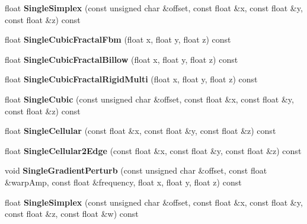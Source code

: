 \begin{DoxyCompactItemize}
\item 
\mbox{\label{class_flounder_1_1_noise_fast_a044f435d09484d9ad846e80c11ecf62e}} 
float {\bfseries Single\+Simplex} (const unsigned char \&offset, const float \&x, const float \&y, const float \&z) const
\item 
\mbox{\label{class_flounder_1_1_noise_fast_a8530cc6bcd53911eb6e41cdb64f566ca}} 
float {\bfseries Single\+Cubic\+Fractal\+Fbm} (float x, float y, float z) const
\item 
\mbox{\label{class_flounder_1_1_noise_fast_a238161d7b89705f710323bcee35ca195}} 
float {\bfseries Single\+Cubic\+Fractal\+Billow} (float x, float y, float z) const
\item 
\mbox{\label{class_flounder_1_1_noise_fast_a440377dbab3c1e304abd6dc2eef91bb4}} 
float {\bfseries Single\+Cubic\+Fractal\+Rigid\+Multi} (float x, float y, float z) const
\item 
\mbox{\label{class_flounder_1_1_noise_fast_a6ce59cfce50f0ddd17cde2c27e075ab3}} 
float {\bfseries Single\+Cubic} (const unsigned char \&offset, const float \&x, const float \&y, const float \&z) const
\item 
\mbox{\label{class_flounder_1_1_noise_fast_aa27273dee2d0fe6b6c1100f49547469b}} 
float {\bfseries Single\+Cellular} (const float \&x, const float \&y, const float \&z) const
\item 
\mbox{\label{class_flounder_1_1_noise_fast_a1ecf5bcf3309dd21f7fa471924787d88}} 
float {\bfseries Single\+Cellular2\+Edge} (const float \&x, const float \&y, const float \&z) const
\item 
\mbox{\label{class_flounder_1_1_noise_fast_ae923d55c388c1c8fc96f313c318a004d}} 
void {\bfseries Single\+Gradient\+Perturb} (const unsigned char \&offset, const float \&warp\+Amp, const float \&frequency, float x, float y, float z) const
\item 
\mbox{\label{class_flounder_1_1_noise_fast_ab9da16168e8d2f45ae17447d5df81003}} 
float {\bfseries Single\+Simplex} (const unsigned char \&offset, const float \&x, const float \&y, const float \&z, const float \&w) const
\end{DoxyCompactItemize}
